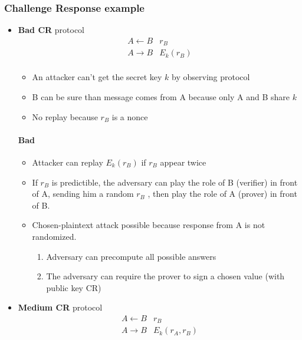 \subsubsection{Challenge Response example}
\begin{itemize}
    \item \textbf{Bad CR} protocol
        \begin{eqnarray*}
            A \leftarrow B & r_B \\
            A \rightarrow B & E_k(r_B) \\
        \end{eqnarray*}

        \begin{itemize}
            \item An attacker can't get the secret key $k$ by
                observing protocol
            \item B can be sure than message comes from A because
                only A and B share $k$
            \item No replay because $r_B$ is a nonce
        \end{itemize}

        \paragraph{Bad}
        \begin{itemize}
            \item Attacker can replay $E_k(r_B)$ if $r_B$ appear twice
            \item If $r_B$ is predictible, the adversary can play
                the role of B (verifier) in front of A, sending him
                a random $r_B$ , then play the role of A (prover) in
                front of B.
            \item Chosen-plaintext attack possible because response
                from A is not randomized.
                \begin{enumerate}
                    \item Adversary can precompute all possible
                        answers
                    \item The adversary can require the
                        prover to sign a chosen value (with
                        public key CR)
                \end{enumerate}
        \end{itemize}

    \item \textbf{Medium CR} protocol
        \begin{eqnarray*}
            A \leftarrow B & r_B \\
            A \rightarrow B & E_k(r_A, r_B) \\
        \end{eqnarray*}


\end{itemize}
